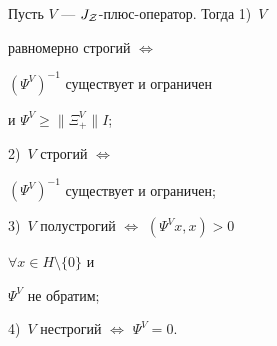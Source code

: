 \begin{cor}


Пусть $V$ --- $J_{\cal Z}$-плюс-оператор. Тогда 1)~$V$


равномерно строгий $\Leftrightarrow$ 


$(\Psi^{V})^{-1}$ существует и ограничен 


и $\Psi^{V}\geq\| \Xi^{V}_{+}\| I$;


2)~$V$ строгий $\Leftrightarrow$ 


$(\Psi^{V})^{-1}$ существует и ограничен; 


3)~$V$ полустрогий $\Leftrightarrow$ $(\Psi^{V}x,x)>0$ 


$\forall x\in H\setminus \{0\}$ и


$\Psi^{V}$ не обратим;


4)~$V$ нестрогий $\Leftrightarrow$ $\Psi^{V}=0$.


\end{cor}





